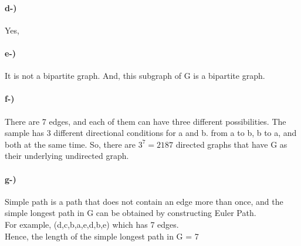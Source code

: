 \documentclass[12pt]{article}
\begin{document}
\paragraph{d-)}
Yes,\\
\paragraph{e-)}
It is not a bipartite graph. And, this subgraph of G is a bipartite graph.\\
\paragraph{f-)}
There are 7 edges, and each of them can have three different possibilities. The sample has 3 different directional conditions for a and b. from a to b, b to a, and both at the same time. So, there are $3^7 = 2187$ directed graphs that have G as their underlying undirected graph.
\paragraph{g-)}
Simple path is a path that does not contain an edge more than once, and the simple longest path in G can be obtained by constructing Euler Path. \\ For example, (d,c,b,a,e,d,b,e) which has 7 edges. \\
Hence, the length of the simple longest path in G = 7
\end{document}
